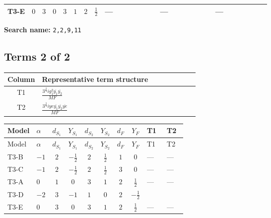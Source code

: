 \documentclass[8pt]{article}
\begin{document}
\begin{landscape}
\begin{longtable}{@{}llcccccc >{\raggedright\arraybackslash}p{0.21\linewidth} >{\raggedright\arraybackslash}p{0.21\linewidth} >{\raggedright\arraybackslash}p{0.21\linewidth}@{}}
\midrule
T3-E & $0$ & $3$ & $0$ & $3$ & $1$ & $2$ & $\frac{1}{2}$ & --- & --- & --- \\
\midrule
\bottomrule
\end{longtable}
\clearpage
\noindent\textbf{Search name: }\texttt{2,2,9,11}\par\smallskip
\subsection*{Terms 2 of 2}
\begin{center}
\begin{tabular}{@{}c >{\raggedright\arraybackslash}p{0.82\linewidth}@{}}
\toprule
Column & Representative term structure \\
\midrule
T1 & \(\displaystyle \frac{3^{\frac{3}{4}} i g_{1}^{2} \overline{y_{1}} \overline{y_{2}}}{MF}\) \\
\midrule
T2 & \(\displaystyle \frac{3^{\frac{3}{4}} i ye \overline{y_{1}} \overline{y_{2}} \overline{ye}}{MF}\) \\
\midrule
\bottomrule
\end{tabular}
\end{center}
\smallskip
\tiny
\begin{longtable}{@{}llcccccc >{\raggedright\arraybackslash}p{0.21\linewidth} >{\raggedright\arraybackslash}p{0.21\linewidth}@{}}
\toprule
Model & $\alpha$ & $d_{S_1}$ & $Y_{S_1}$ & $d_{S_2}$ & $Y_{S_2}$ & $d_F$ & $Y_F$ & T1 & T2 \\
\midrule
\endfirsthead
\toprule
Model & $\alpha$ & $d_{S_1}$ & $Y_{S_1}$ & $d_{S_2}$ & $Y_{S_2}$ & $d_F$ & $Y_F$ & T1 & T2 \\
\midrule
\endhead
T3-B & $-1$ & $2$ & $-\frac{1}{2}$ & $2$ & $\frac{1}{2}$ & $1$ & $0$ & --- & --- \\
\midrule
T3-C & $-1$ & $2$ & $-\frac{1}{2}$ & $2$ & $\frac{1}{2}$ & $3$ & $0$ & --- & --- \\
\midrule
T3-A & $0$ & $1$ & $0$ & $3$ & $1$ & $2$ & $\frac{1}{2}$ & --- & --- \\
\midrule
T3-D & $-2$ & $3$ & $-1$ & $1$ & $0$ & $2$ & $-\frac{1}{2}$ & \scriptsize\adjustbox{max width=\linewidth}{$\begin{gathered} - \frac{3^{\frac{3}{4}} i g_{1}^{2} \overline{y_{1}} \overline{y_{2}}}{8 MF}\end{gathered}$} & \scriptsize\adjustbox{max width=\linewidth}{$\begin{gathered} \frac{3^{\frac{3}{4}} i ye \overline{y_{1}} \overline{y_{2}} \overline{ye}}{12 MF}\end{gathered}$} \\
\midrule
T3-E & $0$ & $3$ & $0$ & $3$ & $1$ & $2$ & $\frac{1}{2}$ & --- & --- \\
\midrule
\bottomrule
\end{longtable}
\clearpage

\end{landscape}
\end{document}
